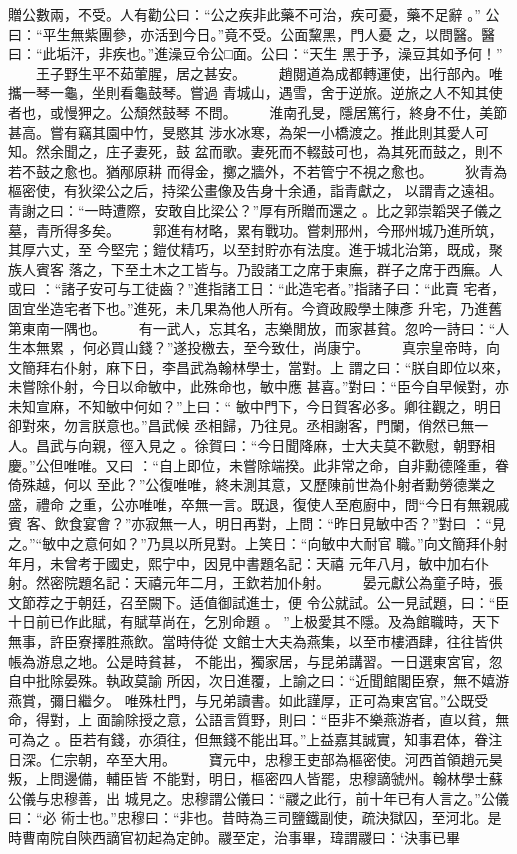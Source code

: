 \documentclass{ctexart}
\begin{document}
贈公數兩，不受。人有勸公曰：``公之疾非此藥不可治，疾可憂，藥不足辭 。'' 公曰：``平生無紫團參，亦活到今日。''竟不受。公面黧黑，門人憂 之，以問醫。醫曰：``此垢汗，非疾也。''進澡豆令公□面。公曰：``天生 黑于予，澡豆其如予何！'' 　　王子野生平不茹葷腥，居之甚安。 　　趙閱道為成都轉運使，出行部內。唯攜一琴一龜，坐則看龜鼓琴。嘗過 青城山，遇雪，舍于逆旅。逆旅之人不知其使者也，或慢狎之。公頹然鼓琴 不問。 　　淮南孔旻，隱居篤行，終身不仕，美節甚高。嘗有竊其園中竹，旻愍其 涉水冰寒，為架一小橋渡之。推此則其愛人可知。然余聞之，庄子妻死，鼓 盆而歌。妻死而不輟鼓可也，為其死而鼓之，則不若不鼓之愈也。猶邴原耕 而得金，擲之牆外，不若管宁不視之愈也。 　　狄青為樞密使，有狄梁公之后，持梁公畫像及告身十余通，詣青獻之， 以謂青之遠祖。青謝之曰：``一時遭際，安敢自比梁公？''厚有所贈而還之 。比之郭崇韜哭子儀之墓，青所得多矣。 　　郭進有材略，累有戰功。嘗刺邢州，今邢州城乃進所筑，其厚六丈，至 今堅完；鎧仗精巧，以至封貯亦有法度。進于城北治第，既成，聚族人賓客 落之，下至土木之工皆与。乃設諸工之席于東廡，群子之席于西廡。人或曰 ：``諸子安可与工徒齒？''進指諸工日：``此造宅者。''指諸子曰：``此賣 宅者，固宜坐造宅者下也。''進死，未几果為他人所有。今資政殿學土陳彥 升宅，乃進舊第東南一隅也。 　　有一武人，忘其名，志樂閒放，而家甚貧。忽吟一詩曰：``人生本無累 ，何必買山錢？''遂投檄去，至今致仕，尚康宁。 　　真宗皇帝時，向文簡拜右仆射，麻下日，李昌武為翰林學士，當對。上 謂之曰：``朕自即位以來，未嘗除仆射，今日以命敏中，此殊命也，敏中應 甚喜。''對曰：``臣今自早候對，亦未知宣麻，不知敏中何如？''上曰：`` 敏中門下，今日賀客必多。卿往觀之，明日卻對來，勿言朕意也。''昌武候 丞相歸，乃往見。丞相謝客，門闌，俏然已無一人。昌武与向親，徑入見之 。徐賀曰：``今日聞降麻，士大夫莫不歡慰，朝野相慶。''公但唯唯。又曰 ：``自上即位，未嘗除端揆。此非常之命，自非勳德隆重，眷倚殊越，何以 至此？''公復唯唯，終未測其意，又歷陳前世為仆射者勳勞德業之盛，禮命 之重，公亦唯唯，卒無一言。既退，復使人至庖廚中，問``今日有無親戚賓 客、飲食宴會？''亦寂無一人，明日再對，上問：``昨日見敏中否？''對曰 ：``見之。''``敏中之意何如？''乃具以所見對。上笑日：``向敏中大耐官 職。''向文簡拜仆射年月，未曾考于國史，熙宁中，因見中書題名記：天禧 元年八月，敏中加右仆射。然密院題名記：天禧元年二月，王欽若加仆射。 　　晏元獻公為童子時，張文節荐之于朝廷，召至闕下。适值御試進士，便 令公就試。公一見試題，曰：``臣十日前已作此賦，有賦草尚在，乞別命題 。 ''上极愛其不隱。及為館職時，天下無事，許臣寮擇胜燕飲。當時侍從 文館士大夫為燕集，以至市樓酒肆，往往皆供帳為游息之地。公是時貧甚， 不能出，獨家居，与昆弟講習。一日選東宮官，忽自中批除晏殊。執政莫諭 所因，次日進覆，上諭之曰：``近聞館閣臣寮，無不嬉游燕賞，彌日繼夕。 唯殊杜門，与兄弟讀書。如此謹厚，正可為東宮官。''公既受命，得對，上 面諭除授之意，公語言質野，則曰：``臣非不樂燕游者，直以貧，無可為之 。臣若有錢，亦須往，但無錢不能出耳。''上益嘉其誠實，知事君体，眷注 日深。仁宗朝，卒至大用。 　　寶元中，忠穆王吏部為樞密使。河西首領趙元昊叛，上問邊備，輔臣皆 不能對，明日，樞密四人皆罷，忠穆謫虢州。翰林學士蘇公儀与忠穆善，出 城見之。忠穆謂公儀曰：``鬷之此行，前十年已有人言之。''公儀曰：``必 術士也。''忠穆曰：``非也。昔時為三司鹽鐵副使，疏決獄囚，至河北。是 時曹南院自陝西謫官初起為定帥。鬷至定，治事畢，瑋謂鬷曰：`決事已畢 
\end{document}
